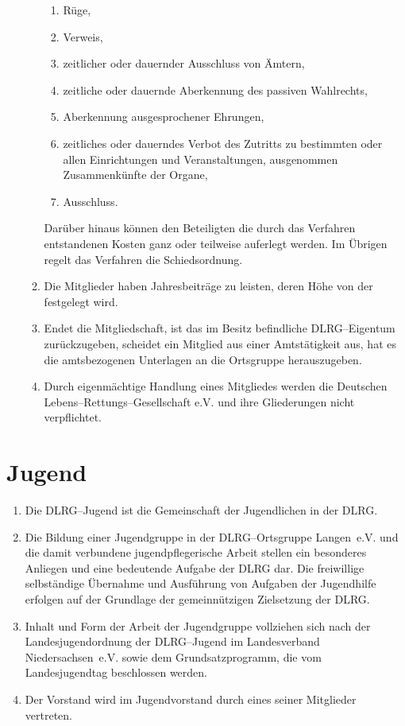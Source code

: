 \documentclass[%
12pt, %
a4paper, %
headsepline, %
parskip, %
headings=normal, %
]{scrreprt}
\begin{document}
\begin{enumerate}
\begin{enumerate}[noitemsep]
\begin{enumerate}
            \item Rüge,
            \item Verweis,
            \item zeitlicher oder dauernder Ausschluss von Ämtern,
            \item zeitliche oder dauernde Aberkennung des passiven Wahlrechts,
            \item Aberkennung ausgesprochener Ehrungen,
            \item zeitliches oder dauerndes Verbot des Zutritts zu bestimmten oder allen Einrichtungen und Veranstaltungen, ausgenommen Zusammenkünfte der Organe,
            \item Ausschluss.
        \end{enumerate}
        Darüber hinaus können den Beteiligten die durch das Verfahren entstandenen Kosten ganz oder teilweise auferlegt werden. Im Übrigen regelt das Verfahren die Schiedsordnung.
        \item Die Mitglieder haben Jahresbeiträge zu leisten, deren Höhe von der  festgelegt wird. 
        \item Endet die Mitgliedschaft, ist das im Besitz befindliche DLRG--Eigentum zurückzugeben, scheidet ein Mitglied aus einer Amtstätigkeit aus, hat es die amtsbezogenen Unterlagen an die Ortsgruppe herauszugeben.
        \item Durch eigenmächtige Handlung eines Mitgliedes werden die Deutschen Lebens--Rettungs--Gesellschaft e.V. und ihre Gliederungen nicht verpflichtet.

    \end{enumerate}
\end{enumerate}

\section{Jugend}
\label{sec:jugend}
\begin{enumerate}
    \item Die DLRG--Jugend ist die Gemeinschaft der Jugendlichen in der DLRG.
    \item Die Bildung einer Jugendgruppe in der DLRG--Ortsgruppe Langen~e.V. und die damit verbundene jugendpflegerische Arbeit stellen ein besonderes Anliegen und eine bedeutende Aufgabe der DLRG dar. Die freiwillige selbständige Übernahme und Ausführung von Aufgaben der Jugendhilfe erfolgen auf der Grundlage der gemeinnützigen Zielsetzung der DLRG.
    \item Inhalt und Form der Arbeit der Jugendgruppe vollziehen sich nach der Landesjugendordnung der DLRG--Jugend im Landesverband Niedersachsen~e.V. sowie dem Grundsatzprogramm, die vom Landesjugendtag beschlossen werden.
    \item Der Vorstand wird im Jugendvorstand durch eines seiner Mitglieder vertreten.
\end{enumerate}
\end{document}
